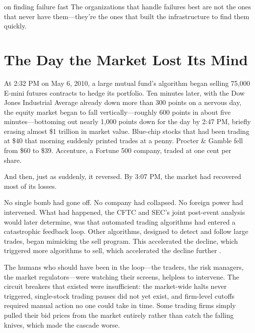 
\label{chap:ch15}
\begin{chapterquote}{on finding failure fast}
The organizations that handle failures best are not the ones that never have them---they're the ones that built the infrastructure to find them quickly.
\end{chapterquote}

\section{The Day the Market Lost Its Mind}
\label{sec:flash-crash}

At 2:32 PM on May 6, 2010, a large mutual fund's algorithm began selling 75,000 E-mini futures contracts to hedge its portfolio. Ten minutes later, with the Dow Jones Industrial Average already down more than 300 points on a nervous day, the equity market began to fall vertically---roughly 600 points in about five minutes---bottoming out nearly 1,000 points down for the day by 2:47 PM, briefly erasing almost \$1 trillion in market value. Blue-chip stocks that had been trading at \$40 that morning suddenly printed trades at a penny. Procter \& Gamble fell from \$60 to \$39. Accenture, a Fortune 500 company, traded at one cent per share.

And then, just as suddenly, it reversed. By 3:07 PM, the market had recovered most of its losses.

No single bomb had gone off. No company had collapsed. No foreign power had intervened. What had happened, the CFTC and SEC's joint post-event analysis would later determine, was that automated trading algorithms had entered a catastrophic feedback loop. Other algorithms, designed to detect and follow large trades, began mimicking the sell program. This accelerated the decline, which triggered more algorithms to sell, which accelerated the decline further \autocite{kirilenko2017flash}.

The humans who should have been in the loop---the traders, the risk managers, the market regulators---were watching their screens, helpless to intervene. The circuit breakers that existed were insufficient: the market-wide halts never triggered, single-stock trading pauses did not yet exist, and firm-level cutoffs required manual action no one could take in time. Some trading firms simply pulled their bid prices from the market entirely rather than catch the falling knives, which made the cascade worse.


